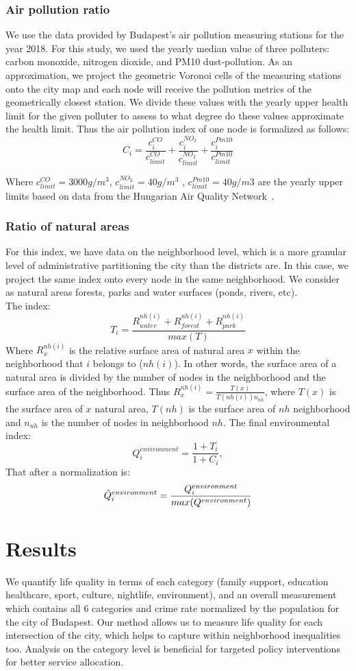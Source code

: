 \subsubsection{Air pollution ratio}
We use the data provided by Budapest’s air pollution measuring stations for the year 2018. For this study, we used the yearly median value of three polluters: carbon monoxide, nitrogen dioxide, and PM10 dust-pollution.
As an approximation, we project the geometric Voronoi cells of the measuring stations onto the city map and each node will receive the pollution metrics of the geometrically closest station. We divide these values with the yearly upper health limit for the given polluter to assess to what degree do these values approximate the health limit. Thus the air pollution index of one node is formalized as follows:
$$C_i=\frac{c_i^{CO}}{c_{limit}^{CO}}+\frac{c_i^{NO_2}}{c_{limit}^{NO_2}}+\frac{c_i^{Pm10}}{c_{limit}^{Pm10}}$$

Where $c^{CO}_{limit}=3000 g/m^3$, $c^{NO_2}_{limit}=40 g/m^3$ , $c^{Pm10}_{limit}=40 g/m3$ are the yearly upper limits based on data from the Hungarian Air Quality Network~\cite{HU2019Pollution}.

\subsubsection{Ratio of natural areas}
For this index, we have data on the neighborhood level, which is a more granular level of administrative partitioning the city than the districts are. In this case, we project the same index onto every node in the same neighborhood. We consider as natural areas forests, parks and water surfaces (ponds, rivers, etc). \\
The index:
$$T_i=\frac{R_{water}^{nh(i)}+ R_{forest}^{nh(i)}+R_{park}^{nh(i)}}{max(T)}$$
Where $R_x^{nh(i)}$ is the relative surface area of natural area $x$ within the neighborhood that $i$ belongs to ($nh(i)$). In other words, the surface area of a natural area is divided by the number of nodes in the neighborhood and the surface area of the neighborhood. Thus
$R_x^{nh(i)}=\frac{T(x)}{T(nh(i))n_{nh}}$, where $T(x)$ is the surface area of $x$ natural area, $T(nh)$ is the surface area of $nh$ neighborhood and $n_{nh}$ is the number of nodes in neighborhood $nh$.
The final environmental index:
$$Q_i^{environment}=\frac{1+T_i}{1+C_i},$$
That after a normalization is:
$$\Tilde{Q}_i^{environment}=\frac{Q_i^{environment}}{max(Q^{environment})}$$


\section{Results}
We quantify life quality in terms of each category (family support, education healthcare, sport, culture, nightlife, environment), and an overall measurement which contains all 6 categories and crime rate normalized by the population for the city of Budapest. Our method allows us to measure life quality for each intersection of the city, which helps to capture within neighborhood inequalities too. Analysis on the category level is beneficial for targeted policy interventions for better service allocation.

